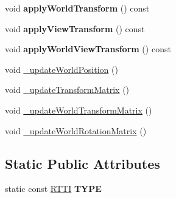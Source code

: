 \begin{DoxyCompactItemize}
\item 
\hypertarget{class_transform_ab949ddd4287a01f3443dcffbb9eef7c7}{
void {\bfseries applyWorldTransform} () const }
\label{class_transform_ab949ddd4287a01f3443dcffbb9eef7c7}

\item 
\hypertarget{class_transform_a0db6a1afc8535b20c2fc4cbd5099764b}{
void {\bfseries applyViewTransform} () const }
\label{class_transform_a0db6a1afc8535b20c2fc4cbd5099764b}

\item 
\hypertarget{class_transform_a0161434d698b7017f9a3eb56ece7547e}{
void {\bfseries applyWorldViewTransform} () const }
\label{class_transform_a0161434d698b7017f9a3eb56ece7547e}

\item 
void \hyperlink{class_transform_a52689327a6d1fabd443da6191251e4b9}{\_\-updateWorldPosition} ()
\item 
void \hyperlink{class_transform_ae8bcdae14fdc45b5b1f1a54f55b82341}{\_\-updateTransformMatrix} ()
\item 
void \hyperlink{class_transform_a3d26f7bc1a10b83809f3780458f5361d}{\_\-updateWorldTransformMatrix} ()
\item 
void \hyperlink{class_transform_a627cc3ba8984b755b42ab629c7d027ea}{\_\-updateWorldRotationMatrix} ()
\end{DoxyCompactItemize}
\subsection*{Static Public Attributes}
\begin{DoxyCompactItemize}
\item 
\hypertarget{class_transform_a6c99a0f2b5cd6f81948b950c695f09a8}{
static const \hyperlink{class_r_t_t_i}{RTTI} {\bfseries TYPE}}
\label{class_transform_a6c99a0f2b5cd6f81948b950c695f09a8}

\end{DoxyCompactItemize}

